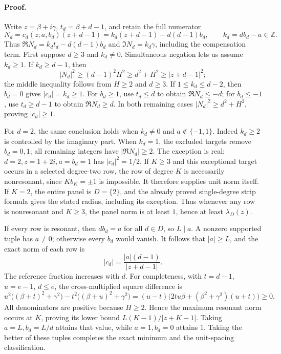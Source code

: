 \paragraph{Proof.}
Write \(z=\beta+i\gamma\), \(t_d=\beta+d-1\), and retain the full numerator
\[
 N_d=c_d(z;a,b_d)(z+d-1)
     =k_d(z+d-1)-d(d-1)b_d,\qquad k_d=db_d-a\in\mathbb Z.
\]
Thus \(\Re N_d=k_dt_d-d(d-1)b_d\) and
\(\Im N_d=k_d\gamma\), including the compensation term.
First suppose \(d\ge3\) and \(k_d\ne0\). Simultaneous negation lets us assume
\(k_d\ge1\). If \(k_d\ge d-1\), then
\[
 |N_d|^2\ge(d-1)^2H^2\ge d^2+H^2\ge|z+d-1|^2;
\]
the middle inequality follows from \(H\ge2\) and \(d\ge3\).
If \(1\le k_d\le d-2\), then \(b_d=0\) gives \(|c_d|=k_d\ge1\).
For \(b_d\ge1\), use \(t_d\le d\) to obtain \(\Re N_d\le-d\);
for \(b_d\le-1\), use \(t_d\ge d-1\) to obtain \(\Re N_d\ge d\).
In both remaining cases \(|N_d|^2\ge d^2+H^2\), proving \(|c_d|\ge1\).

For \(d=2\), the same conclusion holds when \(k_d\ne0\) and
\(a\notin\{-1,1\}\). Indeed \(k_d\ge2\) is controlled by the imaginary
part. When \(k_d=1\), the excluded targets remove \(b_d=0,1\);
all remaining integers have \(|\Re N_d|\ge2\). The exception is real:
\(d=2,z=1+2i,a=b_d=1\) has \(|c_d|^2=1/2\).
If \(K\ge3\) and this exceptional target occurs in a selected degree-two
row, the row of degree \(K\) is necessarily nonresonant, since
\(K b_K=\pm1\) is impossible. It therefore supplies unit norm itself.
If \(K=2\), the entire panel is \(D=\{2\}\), and the already proved
single-degree strip formula gives the stated radius, including its exception.
Thus whenever any row is nonresonant and \(K\ge3\), the panel norm is at least
\(1\), hence at least \(\lambda_D(z)\).

If every row is resonant, then \(db_d=a\) for all \(d\in D\), so \(L\mid a\).
A nonzero supported tuple has \(a\ne0\); otherwise every \(b_d\) would vanish.
It follows that \(|a|\ge L\), and the exact norm of each row is
\[
 |c_d|=\frac{|a|(d-1)}{|z+d-1|}.
\]
The reference fraction increases with \(d\). For completeness, with
\(t=d-1\), \(u=e-1\), \(d\le e\), the cross-multiplied square difference is
\[
 u^2\bigl((\beta+t)^2+\gamma^2\bigr)
 -t^2\bigl((\beta+u)^2+\gamma^2\bigr)
 =(u-t)\bigl(2tu\beta+(\beta^2+\gamma^2)(u+t)\bigr)\ge0.
\]
All denominators are positive because \(H\ge2\).
Hence the maximum resonant norm occurs at \(K\), proving its lower bound
\(L(K-1)/|z+K-1|\). Taking \(a=L,b_d=L/d\) attains that value, while
\(a=1,b_d=0\) attains \(1\). Taking the better of these tuples completes
the exact minimum and the unit-spacing classification.

